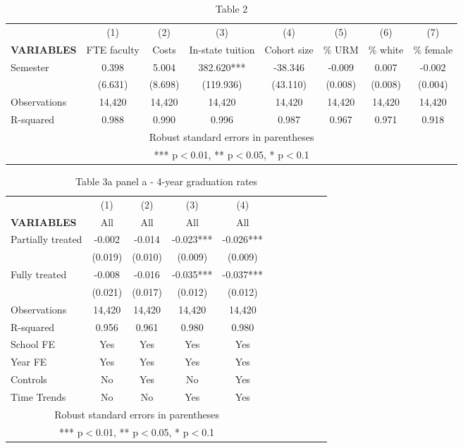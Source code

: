 \documentclass{article}
\begin{document}

\begin{table}[htbp]
\centering 
\caption{Table 2}
\begin{tabular}{lccccccc} 
\toprule
 & (1) & (2) & (3) & (4) & (5) & (6) & (7) \\
\cmidrule(lr){2-8}
\textbf{VARIABLES} & FTE faculty & Costs & In-state tuition & Cohort size & \% URM & \% white & \% female \\
\midrule
Semester & 0.398 & 5.004 & 382.620*** & -38.346 & -0.009 & 0.007 & -0.002 \\
 & (6.631) & (8.698) & (119.936) & (43.110) & (0.008) & (0.008) & (0.004) \\
\midrule
Observations & 14,420 & 14,420 & 14,420 & 14,420 & 14,420 & 14,420 & 14,420 \\
 R-squared & 0.988 & 0.990 & 0.996 & 0.987 & 0.967 & 0.971 & 0.918 \\ 
\midrule
\multicolumn{8}{c}{Robust standard errors in parentheses} \\
\multicolumn{8}{c}{*** p$<$0.01, ** p$<$0.05, * p$<$0.1} \\
\bottomrule
\end{tabular}
\end{table}


\begin{table}[htbp]
\centering 
\caption{Table 3a panel a - 4-year graduation rates}
\begin{tabular}{lcccccccccc}
\toprule
 & (1) & (2) & (3) & (4) \\
\cmidrule(lr){2-5}
\textbf{VARIABLES} & All & All & All & All \\
\midrule
Partially treated & -0.002 & -0.014 & -0.023*** & -0.026*** \\
 & (0.019) & (0.010) & (0.009) & (0.009) \\
Fully treated & -0.008 & -0.016 & -0.035*** & -0.037*** \\
 & (0.021) & (0.017) & (0.012) & (0.012) \\
\midrule
Observations & 14,420 & 14,420 & 14,420 & 14,420 \\
R-squared & 0.956 & 0.961 & 0.980 & 0.980  \\
\midrule
School FE & Yes & Yes & Yes & Yes \\
Year FE & Yes & Yes & Yes & Yes \\
Controls & No & Yes & No & Yes  \\
 Time Trends & No & No & Yes & Yes \\ 
\midrule
\multicolumn{5}{c}{Robust standard errors in parentheses} \\
\multicolumn{5}{c}{*** p$<$0.01, ** p$<$0.05, * p$<$0.1} \\
\bottomrule
\end{tabular}
\end{table}
\end{document}
